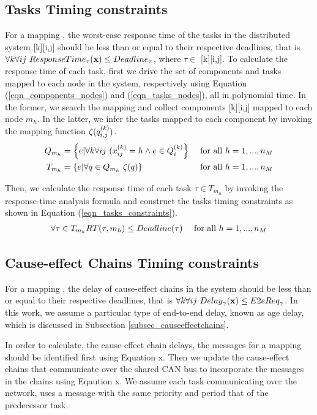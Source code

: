 \subsection{Tasks Timing constraints}
For a mapping \x, the worst-case response time of the tasks in the distributed system [k][i,j] should be less than or equal to their respective deadlines, that is $\forall k\forall ij\ ResponseTime_\tau(\textbf{x})\leq Deadline_\tau$, where $\tau \in$ [k][i,j]. To calculate the response time of each task, first we drive the set of components and tasks mapped to each node in the system, respectively using Equation (\ref{eqn_components_nodes}) and (\ref{eqn_tasks_nodes}), all in polynomial time. In the former, we search the mapping \ttx and collect components [k][i,j] mapped to each node $m_h$. In the latter, we infer the tasks mapped to each component by invoking the mapping function $\zeta(\sss{q}[k][i,j])$.
\begin{align}
\label{eqn_components_nodes}
Q_{m_h}&=\left\{e | \forall k\forall ij\ (\xkij = h \land e\in \sss{Q}\right\}& \mbox{ for all } h=1,...,n_M\\
\label{eqn_tasks_nodes}
T_{m_h}&=\{e | \forall q\in Q_{m_h} \ \zeta(q) \}& \mbox{ for all } h=1,...,n_M
\end{align}

Then, we calculate the response time of each task $\tau \in T_{m_h}$ by invoking the response-time analyais formula and construct the tasks timing constraints as shown in Equation (\ref{eqn_tasks_constraints}).
\begin{align}
\label{eqn_tasks_constraints}
\forall \tau\in T_{m_h} RT(\tau,m_h)&\leq Deadline(\tau)& \mbox{ for all } h=1,...,n_{M}\\
\end{align}

\subsection{Cause-effect Chains Timing constraints}
For a mapping \x, the delay of cause-effect chains in the system should be less than or equal to their respective deadlines, that is $\forall k\forall ij\ Delay_\gamma(\textbf{x})\leq E2eReq_\gamma$. In this work, we assume a particular type of end-to-end delay, known as age delay, which is discussed in Subsection \ref{subsec_causeeffectchains}. 

In order to calculate, the cause-effect chain delays, the messages for a mapping \x should be identified first using Equation x. Then we update the cause-effect chains that communicate over the shared CAN bus to incorporate the messages in the chains using Eqaution x. We assume each task communicating over the network, uses a message with the same priority and period that of the predecessor task.

